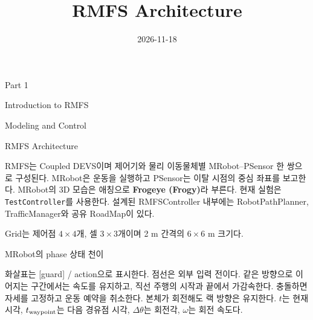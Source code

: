 
\usetikzlibrary{decorations.pathreplacing}
\title{RMFS Architecture}
\date{2026-11-18}


\begin{frame}[plain]
\centering
{\color{accent}\LARGE Part 1\par}\vspace{8mm}
{\LARGE Introduction to RMFS\par Modeling and Control\par}
\end{frame}


\begin{frame}{RMFS Architecture}

\begin{center}
\end{center}

\small RMFS는 Coupled DEVS이며 제어기와 물리 이동물체별 MRobot--PSensor 한 쌍으로 구성된다.
MRobot은 운동을 실행하고 PSensor는 이탈 시점의 중심 좌표를 보고한다. MRobot의 3D 모습은 애칭으로 \textbf{Frogeye (Frogy)}라 부른다.
현재 실험은 \texttt{TestController}를 사용한다. 설계된 RMFSController 내부에는
RobotPathPlanner, TrafficManager와 공유 RoadMap이 있다.\par\smallskip Grid는 제어점 $4\times4$개, 셀 $3\times3$개이며 2 m 간격의 $6\times6$ m 크기다.
\end{frame}

\begin{frame}{MRobot의 phase 상태 천이}
\centering\resizebox{.95\linewidth}{!}{\MRobotDiagram}
\par\medskip\raggedright\small
화살표는 [guard] / action으로 표시한다. 점선은 외부 입력 전이다.
같은 방향으로 이어지는 구간에서는 속도를 유지하고, 직선 주행의 시작과 끝에서 가감속한다.
충돌하면 자세를 고정하고 운동 예약을 취소한다. 본체가 회전해도 랙 방향은 유지한다.
{\scriptsize $t$는 현재 시각, $t_{\rm waypoint}$는 다음 경유점 시각, $\Delta\theta$는 회전각, $\omega$는 회전 속도다.}
\end{frame}


